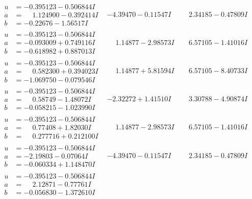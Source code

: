\documentclass[1p]{elsarticle_modified}
\theoremstyle{definition}
\begin{document}
$$\begin{array}{c|c|c}
\begin{aligned}
u &= -0.395123 - 0.506844 I \\
a &= \phantom{-}1.124900 - 0.392414 I \\
b &= -0.22676 - 1.56517 I\end{aligned}
 & -4.39470 - 0.11547 I & \phantom{-}2.34185 - 0.47809 I \\ \hline\begin{aligned}
u &= -0.395123 - 0.506844 I \\
a &= -0.093009 + 0.749116 I \\
b &= -0.618982 + 0.887013 I\end{aligned}
 & \phantom{-}1.14877 - 2.98573 I & \phantom{-}6.57105 - 1.41016 I \\ \hline\begin{aligned}
u &= -0.395123 - 0.506844 I \\
a &= \phantom{-}0.582300 + 0.394023 I \\
b &= -1.069750 - 0.079546 I\end{aligned}
 & \phantom{-}1.14877 + 5.81594 I & \phantom{-}6.57105 - 8.40733 I \\ \hline\begin{aligned}
u &= -0.395123 - 0.506844 I \\
a &= \phantom{-}0.58749 - 1.48072 I \\
b &= -0.058215 - 1.023990 I\end{aligned}
 & -2.32272 + 1.41510 I & \phantom{-}3.30788 - 4.90874 I \\ \hline\begin{aligned}
u &= -0.395123 - 0.506844 I \\
a &= \phantom{-}0.77408 + 1.82030 I \\
b &= \phantom{-}0.277716 + 0.212100 I\end{aligned}
 & \phantom{-}1.14877 - 2.98573 I & \phantom{-}6.57105 - 1.41016 I \\ \hline\begin{aligned}
u &= -0.395123 - 0.506844 I \\
a &= -2.19803 - 0.07064 I \\
b &= -0.060334 + 1.148470 I\end{aligned}
 & -4.39470 - 0.11547 I & \phantom{-}2.34185 - 0.47809 I \\ \hline\begin{aligned}
u &= -0.395123 - 0.506844 I \\
a &= \phantom{-}2.12871 - 0.77761 I \\
b &= -0.056830 - 1.372610 I\end{aligned}

\end{array}$$
\end{document}
